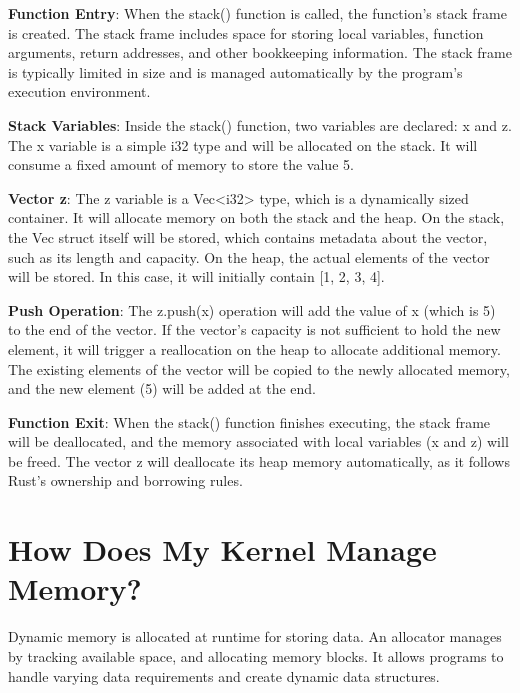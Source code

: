 \documentclass[12pt, letterpaper]{article}
\begin{document}
\noindent \textbf{Function Entry}:
When the stack() function is called, the function's stack frame is created.
The stack frame includes space for storing local variables, function arguments, return addresses, and other bookkeeping information.
The stack frame is typically limited in size and is managed automatically by the program's execution environment.

\medskip

\noindent \textbf{Stack Variables}:
Inside the stack() function, two variables are declared: x and z.
The x variable is a simple i32 type and will be allocated on the stack. It will consume a fixed amount of memory to store the value 5.

\medskip

\noindent \textbf{Vector z}:
The z variable is a Vec<i32> type, which is a dynamically sized container. It will allocate memory on both the stack and the heap.
On the stack, the Vec struct itself will be stored, which contains metadata about the vector, such as its length and capacity.
On the heap, the actual elements of the vector will be stored. In this case, it will initially contain [1, 2, 3, 4].

\medskip

\noindent \textbf{Push Operation}:
The z.push(x) operation will add the value of x (which is 5) to the end of the vector.
If the vector's capacity is not sufficient to hold the new element, it will trigger a reallocation on the heap to allocate additional memory.
The existing elements of the vector will be copied to the newly allocated memory, and the new element (5) will be added at the end.

\medskip

\noindent \textbf{Function Exit}:
When the stack() function finishes executing, the stack frame will be deallocated, and the memory associated with local variables (x and z) will be freed.
The vector z will deallocate its heap memory automatically, as it follows Rust's ownership and borrowing rules.

\section{How Does My Kernel Manage Memory?}

Dynamic memory is allocated at runtime for storing data. An allocator manages by tracking available space, and 
allocating memory blocks. It allows programs to handle varying data requirements and create dynamic data structures.
\end{document}
